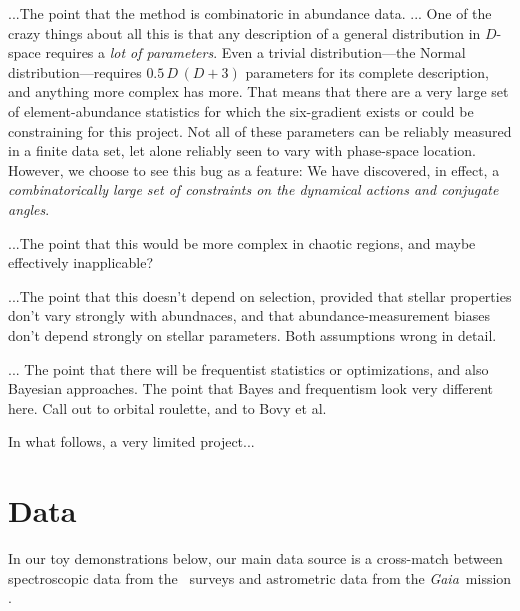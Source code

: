 \documentclass[modern]{aastex63}
\newcommand{\gaia}{\textsl{Gaia}}
\newcommand{\apogee}{\acronym{APOGEE}}
\begin{document}
...The point that the method is combinatoric in abundance data.
...
One of the crazy things about all this is that any description of a general distribution in $D$-space
requires a \emph{lot of parameters}.
Even a trivial distribution---the Normal distribution---requires $0.5\,D\,(D+3)$ parameters for its
complete description, and anything more complex has more.
That means that there are a very large set of element-abundance statistics for which the
six-gradient exists or could be constraining for this project.
Not all of these parameters can be reliably measured in a finite data set,
let alone reliably seen to vary with phase-space location.
However, we choose to see this bug as a feature:
We have discovered, in effect, a \emph{combinatorically large set of constraints on the
dynamical actions and conjugate angles}.

...The point that this would be more complex in chaotic regions, and
maybe effectively inapplicable?

...The point that this doesn't depend on selection, provided that
stellar properties don't vary strongly with abundnaces, and that
abundance-measurement biases don't depend strongly on stellar
parameters. Both assumptions wrong in detail.

... The point that there will be frequentist statistics or
optimizations, and also Bayesian approaches.  The point that Bayes and
frequentism look very different here. Call out to orbital roulette,
and to Bovy et al.

In what follows, a very limited project...

\section{Data}
\label{sec:data}

In our toy demonstrations below, our main data source is a cross-match between
spectroscopic data from the \apogee\ surveys \citep{Majewski:2017} and
astrometric data from the \gaia\ mission \citep{Gaia-Collaboration:2016,
Gaia-Collaboration:2018}.
\end{document}
